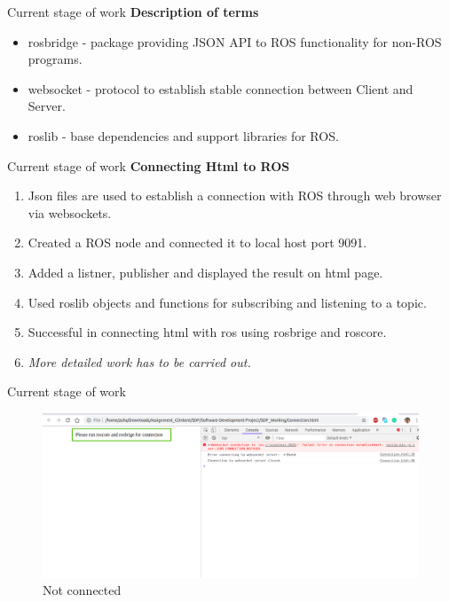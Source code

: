 \documentclass[aspectratio=169]{beamer}
\begin{document}
\begin{frame}{Current stage of work}
\vspace*{-15mm}
\linespread{1.5}
	\textbf{Description of terms}
	\begin{itemize}
\item rosbridge - package providing JSON API to ROS functionality for non-ROS programs.
\item websocket - protocol to establish stable connection between Client and Server.
\item roslib - base dependencies and support libraries for ROS.
	\end{itemize}
\end{frame}

\begin{frame}{Current stage of work}
\vspace*{-10mm}
\linespread{1.5}
	\textbf{Connecting Html to ROS}
	\begin{enumerate}
\item Json files are used to establish a connection with ROS through web browser via websockets.
\item Created a ROS node and connected it to local host port 9091.
\item Added a listner, publisher and displayed the result on html page.
\item Used roslib objects  and functions for subscribing and listening to a topic.
\item Successful in connecting html with ros using rosbrige and roscore.
\item \textit{ More detailed work has to be carried out.}
	\end{enumerate}
\end{frame}

\begin{frame}{Current stage of work}
\begin{figure}
  \includegraphics[width=0.8\linewidth]{notConnected.png}
  \caption{Not connected}
  \label{fig:Not Connected}
\end{figure}
\end{frame}
\end{document}

